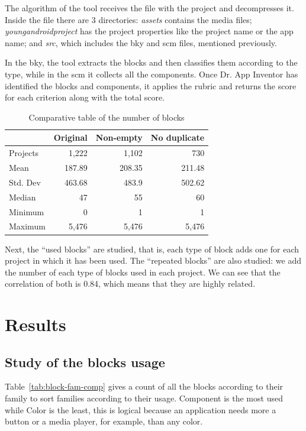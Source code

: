 \documentclass[a4paper]{article}
\begin{document}
The algorithm of the tool receives the file with the project and decompresses it. Inside the file there are 3 directories: \emph{assets} contains the media files; \emph{youngandroidproject} has the project properties like the project name or the app name; and \emph{src}, which includes the bky and scm files, mentioned previously.

In the bky, the tool extracts the blocks and then classifies them according to the type, while in the scm it collects all the components. Once Dr. App Inventor has identified the blocks and components, it applies the rubric and returns the score for each criterion along with the total score.

\begin{table}
\begin{center}
\caption{Comparative table of the number of blocks}
\bigskip
\label{tab:blocks}
\begin{tabular}{|l|r|r|r|}
\hline
& Original & Non-empty & No duplicate \\ \hline
Projects & 1,222 & 1,102 & 730\\ \hline
Mean & 187.89 & 208.35 & 211.48\\ \hline
Std. Dev & 463.68 & 483.9 & 502.62 \\ \hline
Median & 47 & 55 & 60\\ \hline
Minimum & 0 & 1 & 1\\ \hline
Maximum & 5,476 & 5,476 & 5,476 \\ \hline
\end{tabular}
\end{center}
\end{table}

Next, the ``used blocks'' are studied, that is, each type of block adds one for each project in which it has been used. The ``repeated blocks'' are also studied: we add the number of each type of blocks used in each project. We can see that the correlation of both is 0.84, which means that they are highly related.

\section{Results}
\subsection{Study of the blocks usage}
Table~\ref{tab:block-fam-comp} gives a count of all the blocks according to their family to sort families according to their usage. Component is the most used while Color is the least, this is logical because an application needs more a button or a media player, for example, than any color.
\end{document}

